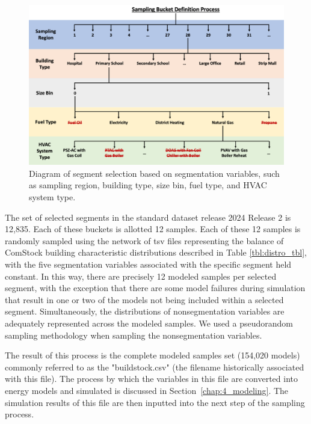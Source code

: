 \begin{figure}
  \centering \includegraphics[width=1\textwidth]{figures/sampling_bucket_definition_process.png}
  \caption{Diagram of segment selection based on segmentation variables, such as sampling region, building type, size bin, fuel type, and HVAC system type.}
   \label{fig:sampling_bucket_process}
\end{figure}

The set of selected segments in the standard dataset release 2024 Release 2 is 12,835. Each of these buckets is allotted 12 samples. Each of these 12 samples is randomly sampled using the network of tsv files representing the balance of ComStock building characteristic distributions described in Table \ref{tbl:distro_tbl}, with the five segmentation variables associated with the specific segment held constant. In this way, there are precisely 12 modeled samples per selected segment, with the exception that there are some model failures during simulation that result in one or two of the models not being included within a selected segment. Simultaneously, the distributions of nonsegmentation variables are adequately represented across the modeled samples. We used a pseudorandom sampling methodology when sampling the nonsegmentation variables.

The result of this process is the complete modeled samples set (154,020 models) commonly referred to as the "buildstock.csv" (the filename historically associated with this file). The process by which the variables in this file are converted into energy models and simulated is discussed in Section~\ref{chap:4_modeling}. The simulation results of this file are then inputted into the next step of the sampling process.

